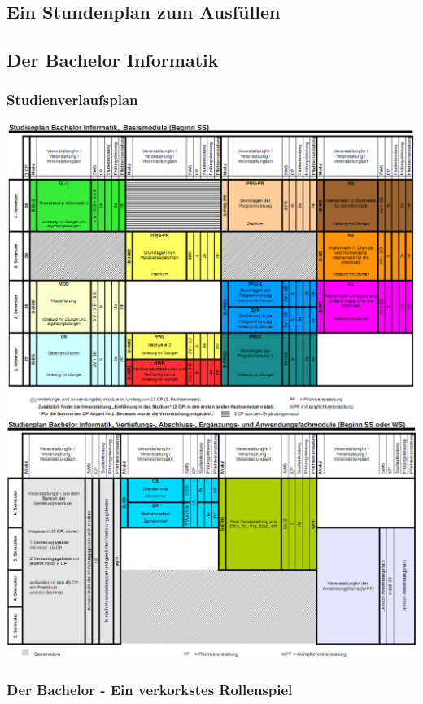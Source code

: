 \documentclass[12pt,a4paper]{scrartcl}
\newcommand{\spaltenanfang}{\begin{multicols}{2}}
\newcommand{\spaltenende}{\end{multicols}}
\begin{document}
\subsection{Ein Stundenplan zum Ausfüllen}

\subsection{Der Bachelor Informatik}
\subsubsection{Studienverlaufsplan}
\includegraphics[width=18cm]{bilder/basismodulebachelorSS}
\newline
\includegraphics[width=18cm]{bilder/sonstigemodulebachelor}
\newpage
\subsubsection{Der Bachelor - Ein verkorkstes Rollenspiel}
\spaltenanfang

\spaltenende
\newpage
\end{document}
